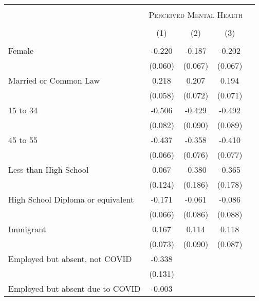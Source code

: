 \begin{tabular*}{\textwidth}{ @{\extracolsep{\fill}}l*{4}{c}}
\hline\hline
\\
& \multicolumn{3}{c}{ \textsc{Perceived Mental Health} } \\
\cline{2-4} \\
                                                  &\multicolumn{1}{c}{(1)}&\multicolumn{1}{c}{(2)}&\multicolumn{1}{c}{(3)}\\
\hline
\\
Female                                            &   -0.220&   -0.187&   -0.202\\
                                                  &  (0.060)&  (0.067)&  (0.067)\\[0.5em]
Married or Common Law                             &    0.218&    0.207&    0.194\\
                                                  &  (0.058)&  (0.072)&  (0.071)\\[0.5em]
15 to 34                                          &   -0.506&   -0.429&   -0.492\\
                                                  &  (0.082)&  (0.090)&  (0.089)\\[0.5em]
45 to 55                                          &   -0.437&   -0.358&   -0.410\\
                                                  &  (0.066)&  (0.076)&  (0.077)\\[0.5em]
Less than High School                             &    0.067&   -0.380&   -0.365\\
                                                  &  (0.124)&  (0.186)&  (0.178)\\[0.5em]
High School Diploma or equivalent                 &   -0.171&   -0.061&   -0.086\\
                                                  &  (0.066)&  (0.086)&  (0.088)\\[0.5em]
Immigrant                                         &    0.167&    0.114&    0.118\\
                                                  &  (0.073)&  (0.090)&  (0.087)\\[0.5em]
Employed but absent, not COVID                    &   -0.338&         &         \\
                                                  &  (0.131)&         &         \\[0.5em]
Employed but absent due to COVID                  &   -0.003&         &         \\

\end{tabular*}

